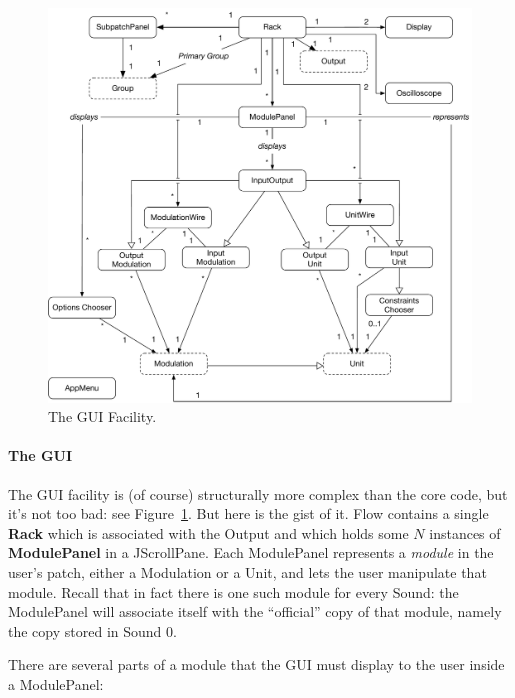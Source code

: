 \documentclass{article}
\newcommand\name{Flow}
\begin{document}
\begin{figure}[t]
\begin{center}\includegraphics[width=5.3in]{GUIUML.pdf}\end{center}
\caption{The GUI Facility.}
\label{gui}
\end{figure}

\paragraph{The GUI} The GUI facility is (of course) structurally more complex than the core code, but it's not too bad: see Figure~\ref{gui}.  But here is the gist of it.  {\name} contains a single {\bf Rack} which is associated with the Output and which holds some \(N\) instances of {\bf ModulePanel} in a JScrollPane.  Each ModulePanel represents a {\it module} in the user's patch, either a Modulation or a Unit, and lets the user manipulate that module.  Recall that in fact there is one such module for every Sound: the ModulePanel will associate itself with the ``official'' copy of that module, namely the copy stored in Sound 0.

There are several parts of a module that the GUI must display to the user inside a ModulePanel:
\end{document}
